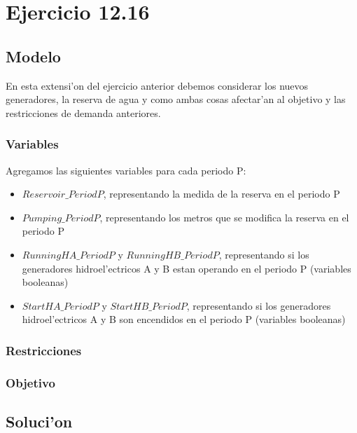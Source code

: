 \section{Ejercicio 12.16}
\subsection{Modelo}
En esta extensi'on del ejercicio anterior debemos considerar los nuevos generadores, la reserva de agua y como ambas cosas afectar'an al objetivo y las restricciones de demanda anteriores. 
\subsubsection{Variables}
Agregamos las siguientes variables para cada periodo P:
\begin{itemize}
\item $Reservoir\_PeriodP$, representando la medida de la reserva en el periodo P
\item $Pumping\_PeriodP$, representando los metros que se modifica la reserva en el periodo P
\item $RunningHA\_PeriodP$ y $RunningHB\_PeriodP$, representando si los generadores hidroel'ectricos A y B estan operando en el periodo P (variables booleanas)
\item $StartHA\_PeriodP$ y $StartHB\_PeriodP$, representando si los generadores hidroel'ectricos A y B son encendidos en el periodo P (variables booleanas)
\end{itemize}
\subsubsection{Restricciones}
\subsubsection{Objetivo}
\subsection{Soluci'on}